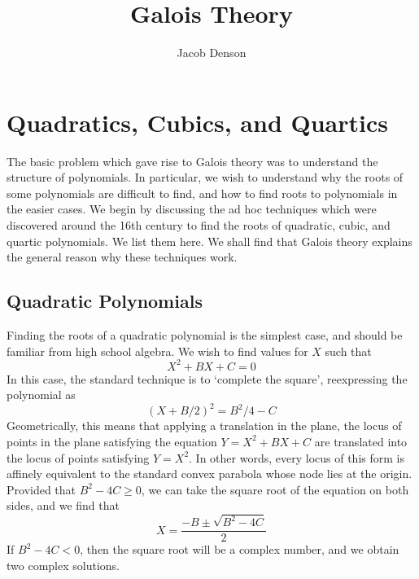 

\title{Galois Theory}
\author{Jacob Denson}



\maketitle
\tableofcontents

\chapter{Quadratics, Cubics, and Quartics}


The basic problem which gave rise to Galois theory was to understand the structure of polynomials. In particular, we wish to understand why the roots of some polynomials are difficult to find, and how to find roots to polynomials in the easier cases. We begin by discussing the ad hoc techniques which were discovered around the 16th century to find the roots of quadratic, cubic, and quartic polynomials. We list them here. We shall find that Galois theory explains the general reason why these techniques work.

\section{Quadratic Polynomials}

Finding the roots of a quadratic polynomial is the simplest case, and should be familiar from high school algebra. We wish to find values for $X$ such that
%
\[ X^2 + BX + C  = 0 \]
%
In this case, the standard technique is to `complete the square', reexpressing the polynomial as
%
\[ \left( X + B/2 \right)^2 = B^2/4 - C \]
%
Geometrically, this means that applying a translation in the plane, the locus of points in the plane satisfying the equation $Y = X^2 + BX + C$ are translated into the locus of points satisfying $Y = X^2$. In other words, every locus of this form is affinely equivalent to the standard convex parabola whose node lies at the origin. Provided that $B^2 - 4C \geq 0$, we can take the square root of the equation on both sides, and we find that
%
\[ X = \frac{-B \pm \sqrt{B^2 - 4C}}{2} \]
%
If $B^2 - 4C < 0$, then the square root will be a complex number, and we obtain two complex solutions.

